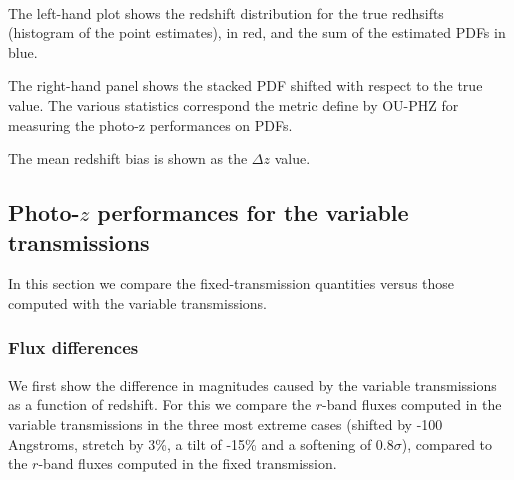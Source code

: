 \documentclass[11pt]{article}
\begin{document}
    \begin{center}
    \end{center}
    { \hspace*{\fill} \\}
    
    The left-hand plot shows the redshift distribution for the true
redhsifts (histogram of the point estimates), in red, and the sum of the
estimated PDFs in blue.

The right-hand panel shows the stacked PDF shifted with respect to the
true value. The various statistics correspond the metric define by
OU-PHZ for measuring the photo-z performances on PDFs.

The mean redshift bias is shown as the \(\Delta z\) value.

\subsection{\texorpdfstring{Photo-\(z\) performances for the variable
transmissions}{Photo-z performances for the variable transmissions}}\label{photo-z-performances-for-the-variable-transmissions}

In this section we compare the fixed-transmission quantities versus
those computed with the variable transmissions.

\subsubsection{Flux differences}\label{flux-differences}

We first show the difference in magnitudes caused by the variable
transmissions as a function of redshift. For this we compare the
\(r\)-band fluxes computed in the variable transmissions in the three
most extreme cases (shifted by -100 Angstroms, stretch by 3\%, a tilt of
-15\% and a softening of 0.8\(\sigma\)), compared to the \(r\)-band
fluxes computed in the fixed transmission.
\end{document}
